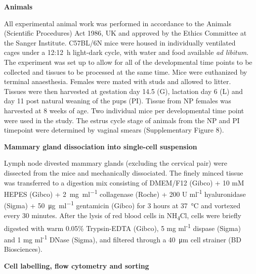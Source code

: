 \documentclass[titlepage, 12pt, oneside]{amsart}
\begin{document}
\textbf{Animals}

All experimental animal work was performed in accordance to the Animals (Scientific Procedures) Act 1986, UK and approved by the Ethics Committee at the Sanger Institute.
C57BL/6N mice were housed in individually ventilated cages under a 12:12~h light-dark cycle, with water and food available \textit{ad libitum}.
The experiment was set up to allow for all of the developmental time points to be collected and tissues to be processed at the same time.
Mice were euthanized by terminal anaesthesia.
Females were mated with studs and allowed to litter.
Tissues were then harvested at gestation day 14.5 (G), lactation day 6 (L) and day 11 post natural weaning of the pups (PI).
Tissue from NP females was harvested at 8 weeks of age.
Two individual mice per developmental time point were used in the study.
The estrus cycle stage of animals from the NP and PI timepoint were determined by vaginal smears (Supplementary Figure 8).

\textbf{Mammary gland dissociation into single-cell suspension}

Lymph node divested mammary glands (excluding the cervical pair) were dissected from the mice and mechanically dissociated.
The finely minced tissue was transferred to a digestion mix consisting of DMEM/F12 (Gibco) + 10 mM HEPES (Gibco) + \SI{2}{\milli\gram\per\milli\litre} collagenase (Roche) + 200 U ml\textsuperscript{-1} hyaluronidase (Sigma) + \SI{50}{\micro\gram\per\milli\litre} gentamicin (Gibco) for 3 hours at \SI{37}{\celsius} and vortexed every 30 minutes.
After the lysis of red blood cells in NH\textsubscript{4}Cl, cells were briefly digested with warm 0.05\% Trypsin-EDTA (Gibco), 5 mg ml\textsuperscript{-1} dispase (Sigma) and 1 mg ml\textsuperscript{-1} DNase (Sigma), and filtered through a \SI{40}{\micro\meter} cell strainer (BD Biosciences).

\textbf{Cell labelling, flow cytometry and sorting}
\end{document}
